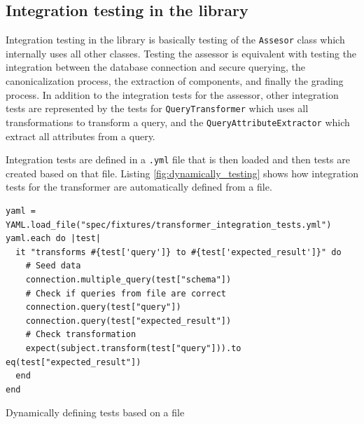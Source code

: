 \subsection{Integration testing in the library} \label{ch:impl:sec:testing:subsec:integ_library}

Integration testing in the library is basically testing of the \texttt{Assesor} class which internally uses all other classes. Testing the assessor is equivalent with testing the integration between the database connection and secure querying, the canonicalization process, the extraction of components, and finally the grading process. In addition to the integration tests for the assessor, other integration tests are represented by the tests for \texttt{QueryTransformer} which uses all transformations to transform a query, and the \texttt{QueryAttributeExtractor} which extract all attributes from a query.

Integration tests are defined in a \texttt{.yml} file that is then loaded and then tests are created based on that file. Listing \ref{fig:dynamically_testing} shows how integration tests for the transformer are automatically defined from a file.

\begin{code}
\begin{verbatim}
yaml = YAML.load_file("spec/fixtures/transformer_integration_tests.yml")
yaml.each do |test|
  it "transforms #{test['query']} to #{test['expected_result']}" do
    # Seed data
    connection.multiple_query(test["schema"])
    # Check if queries from file are correct
    connection.query(test["query"])
    connection.query(test["expected_result"])
    # Check transformation
    expect(subject.transform(test["query"])).to eq(test["expected_result"])
  end
end
\end{verbatim}
\caption{Dynamically defining tests based on a file}
\label{fig:dynamically_testing}
\end{code}